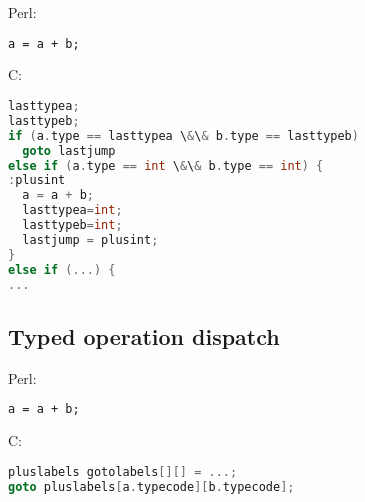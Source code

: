 \documentclass[11pt,a4paper]{article}
\begin{document}
Perl:
\begin{lstlisting}[language=perl]
a = a + b;
\end{lstlisting}

C:
\begin{lstlisting}[language=C]
lasttypea;
lasttypeb;
if (a.type == lasttypea \&\& b.type == lasttypeb)
  goto lastjump
else if (a.type == int \&\& b.type == int) {
:plusint
  a = a + b;
  lasttypea=int;
  lasttypeb=int;
  lastjump = plusint;
}
else if (...) {
...
\end{lstlisting}

\subsection{Typed operation dispatch}


Perl:
\begin{lstlisting}[language=perl]
a = a + b;
\end{lstlisting}

C:
\begin{lstlisting}[language=C]
pluslabels gotolabels[][] = ...;
goto pluslabels[a.typecode][b.typecode];
\end{lstlisting}
\end{document}
